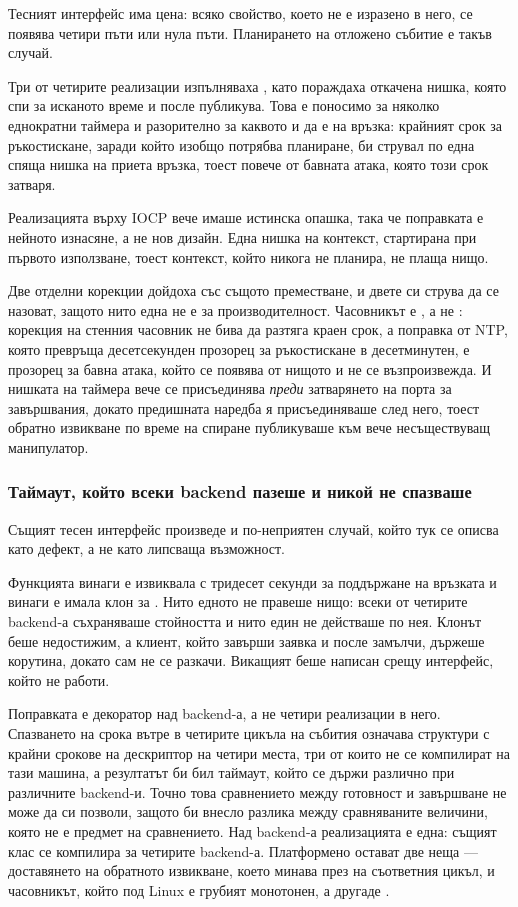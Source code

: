 Тесният интерфейс има цена: всяко свойство, което не е изразено в него, се появява четири
пъти или нула пъти. Планирането на отложено събитие е такъв случай.

Три от четирите реализации изпълняваха , като пораждаха откачена нишка,
която спи за исканото време и после публикува. Това е поносимо за няколко еднократни
таймера и разорително за каквото и да е на връзка: крайният срок за ръкостискане, заради
който изобщо потрябва планиране, би струвал по една спяща нишка на приета връзка, тоест
повече от бавната атака, която този срок затваря.

Реализацията върху IOCP вече имаше истинска опашка, така че поправката е нейното изнасяне,
а не нов дизайн. Една нишка на контекст, стартирана при първото използване, тоест контекст,
който никога не планира, не плаща нищо.

Две отделни корекции дойдоха със същото преместване, и двете си струва да се назоват,
защото нито една не е за производителност. Часовникът е , а не
: корекция на стенния часовник не бива да разтяга краен срок, а
поправка от NTP, която превръща десетсекунден прозорец за ръкостискане в десетминутен, е
прозорец за бавна атака, който се появява от нищото и не се възпроизвежда. И нишката на
таймера вече се присъединява \emph{преди} затварянето на порта за завършвания, докато
предишната наредба я присъединяваше след него, тоест обратно извикване по време на спиране
публикуваше към вече несъществуващ манипулатор.

\subsubsection{Таймаут, който всеки backend пазеше и никой не спазваше}
\label{sec:keepalive}

Същият тесен интерфейс произведе и по-неприятен случай, който тук се описва като дефект, а
не като липсваща възможност.

Функцията  винаги е извиквала  с тридесет
секунди за поддържане на връзката и винаги е имала клон за .
Нито едното не правеше нищо: всеки от четирите backend-а съхраняваше стойността и нито един
не действаше по нея. Клонът беше недостижим, а клиент, който завърши заявка и после замълчи,
държеше корутина, докато сам не се разкачи. Викащият беше написан срещу интерфейс, който не
работи.

Поправката е декоратор над backend-а, а не четири реализации в него. Спазването на срока
вътре в четирите цикъла на събития означава структури с крайни срокове на дескриптор на
четири места, три от които не се компилират на тази машина, а резултатът би бил таймаут,
който се държи различно при различните backend-и. Точно това сравнението между готовност и
завършване не може да си позволи, защото би внесло разлика между сравняваните величини,
която не е предмет на сравнението. Над backend-а реализацията е една: същият клас се компилира за
четирите backend-а. Платформено остават две неща — доставянето на обратното извикване, което
минава през  на съответния цикъл, и часовникът, който под Linux е грубият
монотонен, а другаде .

